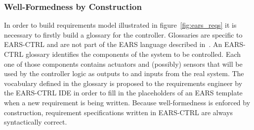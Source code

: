 \subsubsection{Well-Formedness by Construction}
In order to build requirements model illustrated in
figure~\ref{fig:ears_reqs} it is necessary to firstly build a glossary for the
controller. Glossaries are specific to \textsf{EARS-CTRL} and are not part of
the EARS language described in~\cite{EARS09}. An
\textsf{EARS-CTRL} glossary identifies the components of the system to be
controlled. Each one of those components contains actuators and (possibly)
sensors that will be used by the controller logic as outputs to and inputs from
the real system.
The vocabulary defined in the glossary is proposed to the requirements engineer
by the \textsf{EARS-CTRL} IDE in order to fill in the placeholders of an EARS
template when a new requirement is being written. Because well-formedness is
enforced by construction, requirement specifications written in
\textsf{EARS-CTRL} are always syntactically correct.
